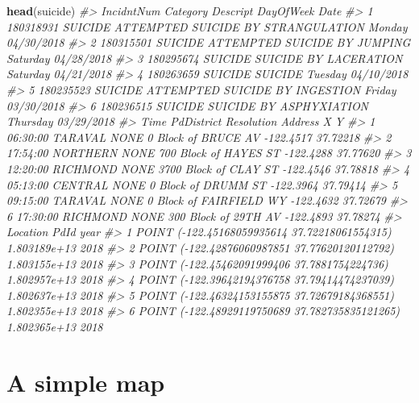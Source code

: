 \documentclass[
  12pt,
]{book}
\newenvironment{Shaded}{\begin{snugshade}}{\end{snugshade}}
\newcommand{\CommentTok}[1]{\textcolor[rgb]{0.37,0.37,0.37}{\textit{#1}}}
\newcommand{\KeywordTok}[1]{\textcolor[rgb]{0.27,0.27,0.27}{\textbf{#1}}}
\newcommand{\NormalTok}[1]{#1}
\begin{document}
\begin{Shaded}
\begin{Highlighting}[]
\KeywordTok{head}\NormalTok{(suicide)}
\CommentTok{\#\textgreater{}   IncidntNum Category                           Descript DayOfWeek       Date}
\CommentTok{\#\textgreater{} 1  180318931  SUICIDE ATTEMPTED SUICIDE BY STRANGULATION    Monday 04/30/2018}
\CommentTok{\#\textgreater{} 2  180315501  SUICIDE       ATTEMPTED SUICIDE BY JUMPING  Saturday 04/28/2018}
\CommentTok{\#\textgreater{} 3  180295674  SUICIDE              SUICIDE BY LACERATION  Saturday 04/21/2018}
\CommentTok{\#\textgreater{} 4  180263659  SUICIDE                            SUICIDE   Tuesday 04/10/2018}
\CommentTok{\#\textgreater{} 5  180235523  SUICIDE     ATTEMPTED SUICIDE BY INGESTION    Friday 03/30/2018}
\CommentTok{\#\textgreater{} 6  180236515  SUICIDE            SUICIDE BY ASPHYXIATION  Thursday 03/29/2018}
\CommentTok{\#\textgreater{}       Time PdDistrict Resolution                 Address         X        Y}
\CommentTok{\#\textgreater{} 1 06:30:00    TARAVAL       NONE     0 Block of BRUCE AV {-}122.4517 37.72218}
\CommentTok{\#\textgreater{} 2 17:54:00   NORTHERN       NONE   700 Block of HAYES ST {-}122.4288 37.77620}
\CommentTok{\#\textgreater{} 3 12:20:00   RICHMOND       NONE   3700 Block of CLAY ST {-}122.4546 37.78818}
\CommentTok{\#\textgreater{} 4 05:13:00    CENTRAL       NONE     0 Block of DRUMM ST {-}122.3964 37.79414}
\CommentTok{\#\textgreater{} 5 09:15:00    TARAVAL       NONE 0 Block of FAIRFIELD WY {-}122.4632 37.72679}
\CommentTok{\#\textgreater{} 6 17:30:00   RICHMOND       NONE    300 Block of 29TH AV {-}122.4893 37.78274}
\CommentTok{\#\textgreater{}                                         Location         PdId year}
\CommentTok{\#\textgreater{} 1  POINT ({-}122.45168059935614 37.72218061554315) 1.803189e+13 2018}
\CommentTok{\#\textgreater{} 2  POINT ({-}122.42876060987851 37.77620120112792) 1.803155e+13 2018}
\CommentTok{\#\textgreater{} 3   POINT ({-}122.45462091999406 37.7881754224736) 1.802957e+13 2018}
\CommentTok{\#\textgreater{} 4  POINT ({-}122.39642194376758 37.79414474237039) 1.802637e+13 2018}
\CommentTok{\#\textgreater{} 5  POINT ({-}122.46324153155875 37.72679184368551) 1.802355e+13 2018}
\CommentTok{\#\textgreater{} 6 POINT ({-}122.48929119750689 37.782735835121265) 1.802365e+13 2018}
\end{Highlighting}
\end{Shaded}

\hypertarget{a-simple-map}{%
\section{A simple map}\label{a-simple-map}}
\end{document}
